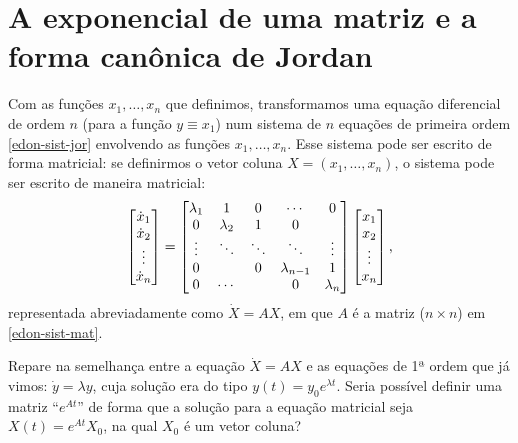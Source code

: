 \documentclass[12pt,a4paper,oneside]{memoir}
\begin{document}
\section{A exponencial de uma matriz e a forma canônica de Jordan}

Com as funções $x_1, \ldots, x_n$ que definimos, transformamos uma equação diferencial de ordem $n$ (para a função $y \equiv x_1$) num sistema de $n$ equações de primeira ordem \eqref{edon-sist-jor} envolvendo as funções $x_1, \ldots, x_n$.  Esse sistema pode ser escrito de forma matricial: se definirmos o vetor coluna $X = (x_1, \ldots, x_n)$, o sistema pode ser escrito de maneira matricial:
\begin{equation}
\label{edon-sist-mat}
  \begin{bmatrix}
    \dot{x}_1 \\ \dot{x}_2 \\ \vdots \\ \dot{x}_n
  \end{bmatrix}
  =
  \begin{bmatrix}
    \lambda_1 & 1 & 0 & \cdots & 0 \\
    0 & \lambda_2 & 1 & 0 & \\
    \vdots & \ddots & \ddots & \ddots & \vdots \\
    0 & &  0 & \lambda_{n-1} & 1 \\
    0 & \cdots & & 0 & \lambda_n
  \end{bmatrix}
  \begin{bmatrix}
    x_1 \\ x_2 \\ \vdots \\ x_n
  \end{bmatrix} \text,
\end{equation}
representada abreviadamente como $\dot{X} = AX$, em que $A$ é a matriz ($n \times n$) em \eqref{edon-sist-mat}.

Repare na semelhança entre a equação $\dot{X} = AX$ e as equações de 1ª ordem que já vimos: $\dot{y} = \lambda y$, cuja solução era do tipo $y(t) = y_0 e^{\lambda t}$.  Seria possível definir uma matriz ``$e^{At}$'' de forma que a solução para a equação matricial seja $X(t) = e^{At} X_0$, na qual $X_0$ é um vetor coluna?
\end{document}
